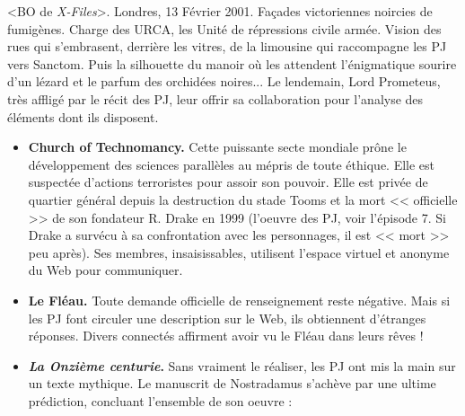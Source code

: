 \documentclass[11pt,twoside,a4paper]{book}
\begin{document}
<BO de \emph{X-Files}>. Londres, 13 F{\'e}vrier 2001. Fa\c{c}ades victoriennes noircies de fumig{\`e}nes. Charge des URCA, les Unit{\'e} de r{\'e}pressions civile arm{\'e}e. Vision des rues qui s'embrasent, derri{\`e}re les vitres, de la limousine qui raccompagne les PJ vers Sanctom. Puis la silhouette du manoir o{\`u} les attendent l'{\'e}nigmatique sourire d'un l{\'e}zard et le parfum des orchid{\'e}es noires... Le lendemain, Lord Prometeus, tr{\`e}s afflig{\'e} par le r{\'e}cit des PJ, leur offrir sa collaboration pour l'analyse des {\'e}l{\'e}ments dont ils disposent.~\\

\setlength\parindent{20pt}
\begin{itemize}
	\item \textbf{Church of Technomancy.} Cette puissante secte mondiale pr{\^o}ne le d{\'e}veloppement
des sciences parall{\`e}les au m{\'e}pris de toute {\'e}thique. Elle est suspect{\'e}e d'actions
terroristes pour assoir son pouvoir. Elle est priv{\'e}e de quartier g{\'e}n{\'e}ral depuis la
destruction du stade Tooms et la mort << officielle >> de son fondateur R. Drake en 1999
(l'oeuvre des PJ, voir l'{\'e}pisode 7. Si Drake a surv{\'e}cu {\`a} sa confrontation avec les
personnages, il est << mort >> peu apr{\`e}s). Ses membres, insaisissables, utilisent l'espace
virtuel et anonyme du Web pour communiquer.
	\item \textbf{Le Fl{\'e}au.} Toute demande officielle de renseignement reste n{\'e}gative. Mais si les PJ
font circuler une description sur le Web, ils obtiennent d'{\'e}tranges r{\'e}ponses. Divers
connect{\'e}s affirment avoir vu le Fl{\'e}au dans leurs r{\^e}ves !
	\item \textbf{\emph{La Onzi{\`e}me centurie}.} Sans vraiment le r{\'e}aliser, les PJ ont mis la main sur un texte
mythique. Le manuscrit de Nostradamus s'ach{\`e}ve par une ultime pr{\'e}diction, concluant
l'ensemble de son oeuvre :~\\


\end{itemize}
\end{document}
